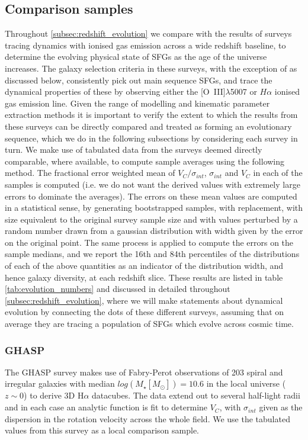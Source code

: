 \documentclass[fleqn,usenatbib]{mn2e}
\begin{document}
\subsection{Comparison samples}\label{subsubsec:comparison_samples}
Throughout \cref{subsec:redshift_evolution} we compare with the results of surveys tracing dynamics with ionised gas emission across a wide redshift baseline, to determine the evolving physical state of SFGs as the age of the universe increases.
The galaxy selection criteria in these surveys, with the exception of \cite{Green2014} as discussed below, consistently pick out main sequence SFGs, and trace the dynamical properties of these by observing either the [O~{\sc III}]$\lambda$5007 or $H\alpha$ ionised gas emission line.
Given the range of modelling and kinematic parameter extraction methods it is important to verify the extent to which the results from these surveys can be directly compared and treated as forming an evolutionary sequence, which we do in the following subsections by considering each survey in turn.
We make use of tabulated data from the surveys deemed directly comparable, where available, to compute sample averages using the following method. 
The fractional error weighted mean of $V_{C}/\sigma_{int}$, $\sigma_{int}$ and $V_{C}$ in each of the samples is computed (i.e. we do not want the derived values with extremely large errors to dominate the averages).
The errors on these mean values are computed in a statistical sense, by generating bootstrapped samples, with replacement, with size equivalent to the original survey sample size and with values perturbed by a random number drawn from a gaussian distribution with width given by the error on the original point.
The same process is applied to compute the errors on the sample medians, and we report the 16th and 84th percentiles of the distributions of each of the above quantities as an indicator of the distribution width, and hence galaxy diversity, at each redshift slice.
These results are listed in table \ref{tab:evolution_numbers} and discussed in detailed throughout \cref{subsec:redshift_evolution}, where we will make statements about dynamical evolution by connecting the dots of these different surveys, assuming that on average they are tracing a population of SFGs which evolve across cosmic time. 

\subsubsection{GHASP}\label{subsubsec:GHASP}
The GHASP survey \citep[E08]{Epinat2008a,Epinat2008} makes use of Fabry-Perot observations of 203 spiral and irregular galaxies with median $log(M_{\star}[M_{\odot}])=10.6$ in the local universe ($z\sim0$) to derive 3D H$\alpha$ datacubes.
The data extend out to several half-light radii and in each case an analytic function is fit to determine $V_{C}$, with $\sigma_{int}$ given as the dispersion in the rotation velocity across the whole field.
We use the tabulated values from this survey as a local comparison sample.
\end{document}
